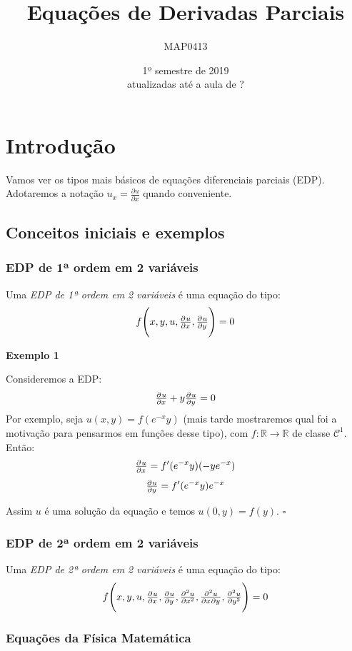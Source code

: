 \documentclass[11pt,twoside,a4paper]{book}
\title{Equações de Derivadas Parciais}
\author{MAP0413}
\date{1º semestre de 2019 \\ atualizadas até a aula de ?}
\begin{document}
\maketitle

\tableofcontents

\newpage

\chapter{Introdução}

Vamos ver os tipos mais básicos de equações diferenciais parciais (EDP). Adotaremos a notação $u_x = \frac{\partial u}{\partial x}$ quando conveniente. 

\section{Conceitos iniciais e exemplos}

\subsection{EDP de 1ª ordem em 2 variáveis}

Uma \emph{EDP de 1ª ordem em 2 variáveis} é uma equação do tipo:
\[
f\Bigg(x,y,u,\pd{u}{x},\pd{u}{y}\Bigg) = 0
\]


\smallskip
\noindent
\textbf{Exemplo 1}

\smallskip
\noindent
Consideremos a EDP:
\[
\pd{u}{x}+y\pd{u}{y} = 0
\]
Por exemplo, seja $u(x,y)=f(e^{-x}y)$ (mais tarde mostraremos qual foi a motivação para pensarmos em funções desse tipo), com $f:\mathbb{R}\rightarrow\mathbb{R}$ de classe $\mathcal{C}^1$. Então:
\[
\pd{u}{x}=f'(e^{-x}y)(-ye^{-x})
\]
\[
\pd{u}{y}=f'(e^{-x}y)e^{-x}
\]

\smallskip
\noindent
Assim $u$ é uma solução da equação e temos $u(0,y)=f(y)$. $\square$

\subsection{EDP de 2ª ordem em 2 variáveis}

Uma \emph{EDP de 2ª ordem em 2 variáveis} é uma equação do tipo:
\[
f\Bigg(x,y,u,\pd{u}{x},\pd{u}{y},\pd[2]{u}{x},\md{u}{2}{x}{}{y}{},\pd[2]{u}{y}\Bigg) = 0
\]

\subsection{Equações da Física Matemática}
\end{document}
